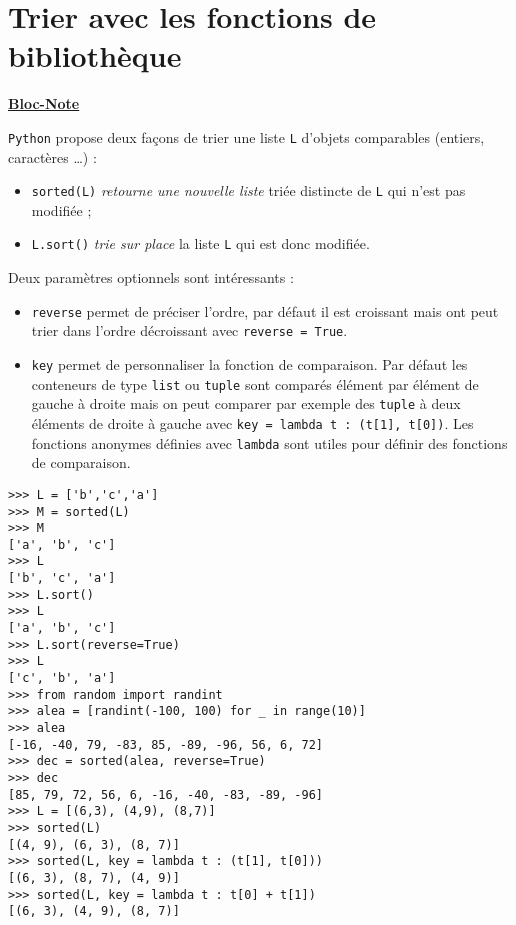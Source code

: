 \documentclass[a4paper, french, 12pt]{article}  %
\newcounter{act}
\newcounter{blocn}
\newenvironment{blocnote}[1]
{\par \medskip   \addtocounter{blocn}{1} \begin{leftbar} \noindent  \underline{\textbf{Bloc-Note} \textbf{\theblocn}} \hspace{0.5cm}{\itshape #1}   \vspace*{10pt} \par }
{\end{leftbar} \par \bigskip }
\newcounter{prop}
\begin{document}
\section{Trier avec les fonctions de bibliothèque}

\begin{blocnote}{}
\texttt{Python} propose deux façons de  trier une liste \verb+L+ d'objets comparables (entiers, caractères \ldots)   :

\begin{itemize}[label=]

\item \verb+sorted(L)+   \emph{retourne une nouvelle liste} triée distincte de   \texttt{L} qui n'est pas modifiée ;
\item \verb+L.sort()+ \emph{trie sur place} la liste \verb+L+ qui est donc  modifiée.

\end{itemize}

Deux  paramètres optionnels sont intéressants :

\begin{itemize}[label=]

\item \verb+reverse+ permet de préciser l'ordre, par défaut il est croissant  mais ont peut trier dans l'ordre décroissant avec \verb+reverse = True+.
\item \verb+key+ permet de personnaliser la fonction de comparaison. Par défaut les conteneurs de type \lstinline+list+ ou \lstinline+tuple+  sont comparés élément par élément  de gauche à droite mais on peut comparer par exemple des   \lstinline+tuple+ à deux éléments    de droite à gauche  avec \lstinline+key = lambda t : (t[1], t[0])+. Les fonctions anonymes définies avec \lstinline+lambda+ sont utiles pour définir des fonctions de comparaison.
\end{itemize}




\begin{lstlisting}
>>> L = ['b','c','a']
>>> M = sorted(L)
>>> M
['a', 'b', 'c']
>>> L
['b', 'c', 'a']
>>> L.sort()
>>> L
['a', 'b', 'c']
>>> L.sort(reverse=True)
>>> L
['c', 'b', 'a']
>>> from random import randint
>>> alea = [randint(-100, 100) for _ in range(10)]
>>> alea
[-16, -40, 79, -83, 85, -89, -96, 56, 6, 72]
>>> dec = sorted(alea, reverse=True)
>>> dec
[85, 79, 72, 56, 6, -16, -40, -83, -89, -96]
>>> L = [(6,3), (4,9), (8,7)]
>>> sorted(L)
[(4, 9), (6, 3), (8, 7)]
>>> sorted(L, key = lambda t : (t[1], t[0]))
[(6, 3), (8, 7), (4, 9)]
>>> sorted(L, key = lambda t : t[0] + t[1])
[(6, 3), (4, 9), (8, 7)]

\end{lstlisting}

\end{blocnote}
\end{document}
